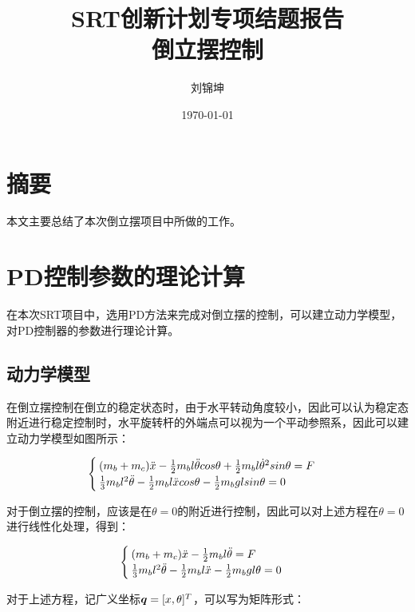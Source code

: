\documentclass[UTF8]{ctexart}
\title{SRT创新计划专项结题报告\\倒立摆控制}
\author{刘锦坤}
\date{\today}
\begin{document}
\fancyfoot[C]{\thepage}

\maketitle
\tableofcontents
\newpage

\section{摘要}

本文主要总结了本次倒立摆项目中所做的工作。

\section{PD控制参数的理论计算}

在本次SRT项目中，选用PD方法来完成对倒立摆的控制，可以建立动力学模型，对PD控制器的参数进行理论计算。

\subsection{动力学模型}

在倒立摆控制在倒立的稳定状态时，由于水平转动角度较小，因此可以认为稳定态附近进行稳定控制时，水平旋转杆的外端点可以视为一个平动参照系，因此可以建立动力学模型如图所示：

\begin{equation}
    \begin{cases}
        (m_b+m_c) \ddot{x}-\frac{1}{2} m_b l \ddot{\theta}cos\theta+\frac{1}{2} m_b l {\dot{\theta}}^2 sin\theta=F\\
        \frac{1}{3} m_b l^2 \ddot{\theta}-\frac{1}{2} m_b l \ddot{x} cos\theta-\frac{1}{2} m_b g l sin\theta = 0 
    \end{cases}
\end{equation}

\noindent 对于倒立摆的控制，应该是在$\theta = 0$的附近进行控制，因此可以对上述方程在$\theta = 0$进行线性化处理，得到：

\begin{equation}
    \begin{cases}
        (m_b+m_c) \ddot{x}-\frac{1}{2} m_b l \ddot{\theta} = F\\
        \frac{1}{3} m_b l^2 \ddot{\theta}-\frac{1}{2} m_b l \ddot{x} -\frac{1}{2} m_b g l \theta = 0 
    \end{cases}
\end{equation}

\noindent 对于上述方程，记广义坐标$\boldsymbol{q}=[x,\theta]^T$，可以写为矩阵形式：
\end{document}
